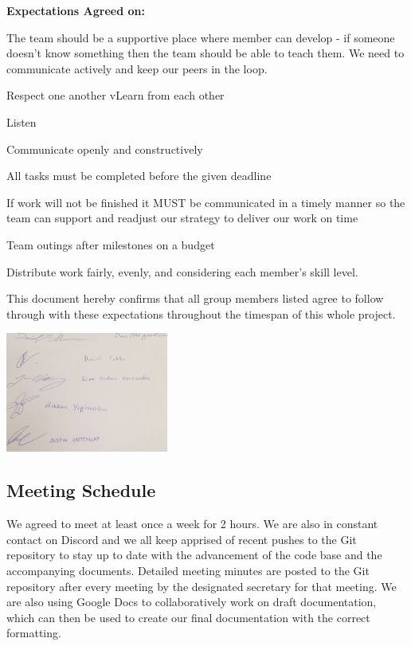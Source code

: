 \documentclass[a4paper, 12pt]{article}
\begin{document}
\textbf{Expectations Agreed on:}
\begin{compactitem}
\item The team should be a supportive place where member can develop - if someone doesn’t know something then the team should be able to teach them. We need to communicate actively and keep our peers in the loop.
\item Respect one another
vLearn from each other
\item Listen 
\item Communicate openly and constructively
\item All tasks must be completed before the given deadline
\item If work will not be finished it MUST be communicated in a timely manner so the team can support and readjust our strategy to deliver our work on time
\item Team outings after milestones on a budget
\item Distribute work fairly, evenly, and considering each member’s skill level.
\end{compactitem}
\bigskip

This document hereby confirms that all group members listed agree to follow through with these expectations throughout the timespan of this whole project. 


\begin{center}
\includegraphics[width=0.4\textwidth]{ExpectationSignatures.jpg}
\end{center}

\subsection{Meeting Schedule}

We agreed to meet at least once a week for 2 hours. We are also in constant contact on Discord and we all keep apprised of recent pushes to the Git repository to stay up to date with the advancement of the code base and the accompanying documents. Detailed meeting minutes are posted to the Git repository after every meeting by the designated secretary for that meeting. We are also using Google Docs to collaboratively work on draft documentation, which can then be used to create our final documentation with the correct formatting.
\end{document}
